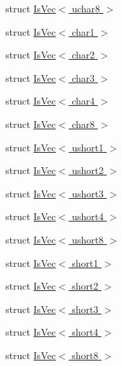 \begin{DoxyCompactItemize}
\item 
struct \hyperlink{structcv_1_1gpu_1_1device_1_1type__traits__detail_1_1IsVec_3_01uchar8_01_4}{Is\-Vec$<$ uchar8 $>$}
\item 
struct \hyperlink{structcv_1_1gpu_1_1device_1_1type__traits__detail_1_1IsVec_3_01char1_01_4}{Is\-Vec$<$ char1 $>$}
\item 
struct \hyperlink{structcv_1_1gpu_1_1device_1_1type__traits__detail_1_1IsVec_3_01char2_01_4}{Is\-Vec$<$ char2 $>$}
\item 
struct \hyperlink{structcv_1_1gpu_1_1device_1_1type__traits__detail_1_1IsVec_3_01char3_01_4}{Is\-Vec$<$ char3 $>$}
\item 
struct \hyperlink{structcv_1_1gpu_1_1device_1_1type__traits__detail_1_1IsVec_3_01char4_01_4}{Is\-Vec$<$ char4 $>$}
\item 
struct \hyperlink{structcv_1_1gpu_1_1device_1_1type__traits__detail_1_1IsVec_3_01char8_01_4}{Is\-Vec$<$ char8 $>$}
\item 
struct \hyperlink{structcv_1_1gpu_1_1device_1_1type__traits__detail_1_1IsVec_3_01ushort1_01_4}{Is\-Vec$<$ ushort1 $>$}
\item 
struct \hyperlink{structcv_1_1gpu_1_1device_1_1type__traits__detail_1_1IsVec_3_01ushort2_01_4}{Is\-Vec$<$ ushort2 $>$}
\item 
struct \hyperlink{structcv_1_1gpu_1_1device_1_1type__traits__detail_1_1IsVec_3_01ushort3_01_4}{Is\-Vec$<$ ushort3 $>$}
\item 
struct \hyperlink{structcv_1_1gpu_1_1device_1_1type__traits__detail_1_1IsVec_3_01ushort4_01_4}{Is\-Vec$<$ ushort4 $>$}
\item 
struct \hyperlink{structcv_1_1gpu_1_1device_1_1type__traits__detail_1_1IsVec_3_01ushort8_01_4}{Is\-Vec$<$ ushort8 $>$}
\item 
struct \hyperlink{structcv_1_1gpu_1_1device_1_1type__traits__detail_1_1IsVec_3_01short1_01_4}{Is\-Vec$<$ short1 $>$}
\item 
struct \hyperlink{structcv_1_1gpu_1_1device_1_1type__traits__detail_1_1IsVec_3_01short2_01_4}{Is\-Vec$<$ short2 $>$}
\item 
struct \hyperlink{structcv_1_1gpu_1_1device_1_1type__traits__detail_1_1IsVec_3_01short3_01_4}{Is\-Vec$<$ short3 $>$}
\item 
struct \hyperlink{structcv_1_1gpu_1_1device_1_1type__traits__detail_1_1IsVec_3_01short4_01_4}{Is\-Vec$<$ short4 $>$}
\item 
struct \hyperlink{structcv_1_1gpu_1_1device_1_1type__traits__detail_1_1IsVec_3_01short8_01_4}{Is\-Vec$<$ short8 $>$}

\end{DoxyCompactItemize}
